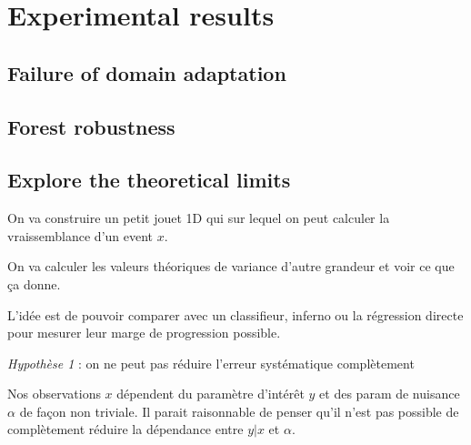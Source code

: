 
\chapter{Experimental results}
\label{chap:systml}
\ifpdf
    \graphicspath{{Chapter4/Figs/Raster/}{Chapter4/Figs/PDF/}{Chapter4/Figs/}}
\else
    \graphicspath{{Chapter4/Figs/Vector/}{Chapter4/Figs/}}
\fi




\section{Failure of domain adaptation} %
\label{sec:failure_of_domain_adaptation}






\section{Forest robustness} %
\label{sec:forest_robustness}




\section{Explore the theoretical limits}

On va construire un petit jouet 1D qui sur lequel on peut calculer la vraissemblance d'un event $x$.

On va calculer les valeurs théoriques de variance d'autre grandeur et voir ce que ça donne.

L'idée est de pouvoir comparer avec un classifieur, inferno ou la régression directe pour mesurer leur marge de progression possible.

\emph{Hypothèse 1} : on ne peut pas réduire l'erreur systématique complètement

Nos observations $x$ dépendent du paramètre d'intérêt $y$ et des param de nuisance $\alpha$ de façon non triviale.
Il parait raisonnable de penser qu'il n'est pas possible de complètement réduire la dépendance entre $y|x$ et $\alpha$.


